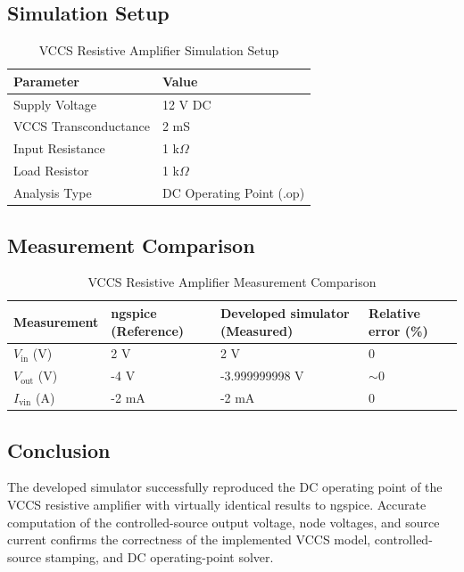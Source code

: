 \subsection{Simulation Setup}
\begin{table}[H]
\centering
\caption{VCCS Resistive Amplifier Simulation Setup}
\label{tab:vccs_setup}
\begin{tabular}{ll}
\toprule
\textbf{Parameter} & \textbf{Value} \\
\midrule
Supply Voltage        & 12 V DC \\
VCCS Transconductance & 2 mS \\
Input Resistance      & 1 k$\Omega$ \\
Load Resistor         & 1 k$\Omega$ \\
Analysis Type         & DC Operating Point (.op) \\
\bottomrule
\end{tabular}
\end{table}

\subsection{Measurement Comparison}
\begin{table}[H]
\centering
\caption{VCCS Resistive Amplifier Measurement Comparison}
\label{tab:vccs_comparison}
\begin{tabular}{llll}
\toprule
\textbf{Measurement} & \textbf{ngspice (Reference)} & \textbf{Developed simulator (Measured)} & \textbf{Relative error (\%)} \\
\midrule
$V_{\text{in}}$ (V)  & 2 V   & 2 V           & 0 \\
$V_{\text{out}}$ (V) & -4 V  & -3.999999998 V & $\sim$0 \\
$I_{\text{vin}}$ (A) & -2 mA & -2 mA         & 0 \\
\bottomrule
\end{tabular}
\end{table}

\subsection{Conclusion}
The developed simulator successfully reproduced the DC operating point of the VCCS resistive amplifier with virtually identical results to ngspice. Accurate computation of the controlled-source output voltage, node voltages, and source current confirms the correctness of the implemented VCCS model, controlled-source stamping, and DC operating-point solver.

